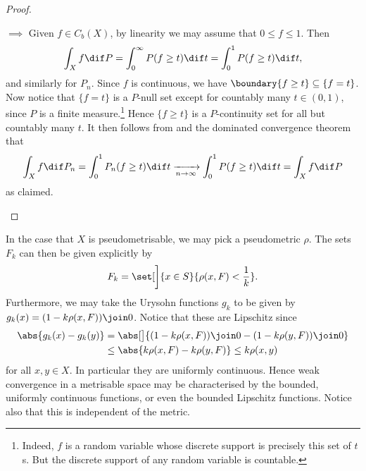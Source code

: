 \documentclass[article, a4paper, 11pt, oneside]{memoir}
\numberwithin{equation}{chapter}
\begin{document}
\begin{proof}
\begin{proofsec}
    \item[\subcref{enum:portmanteau-continuity-sets} $\implies$ \subcref{enum:portmanteau-weak-convergence}]
    Given $f \in C_b(X)$, by linearity we may assume that $0 \leq f \leq 1$. Then
    \begin{equation*}
        \int_X f \dif P
            = \int_0^\infty P( f \geq t ) \dif t
            = \int_0^1 P( f \geq t ) \dif t,
    \end{equation*}
    and similarly for $P_n$. Since $f$ is continuous, we have $\boundary \{ f \geq t \} \subseteq \{ f = t \}$. Now notice that $\{ f = t \}$ is a $P$-null set except for countably many $t \in (0,1)$, since $P$ is a finite measure.\footnote{Indeed, $f$ is a random variable whose discrete support is precisely this set of $t$s. But the discrete support of any random variable is countable.} Hence $\{ f \geq t \}$ is a $P$-continuity set for all but countably many $t$. It then follows from  and the dominated convergence theorem that
    \begin{equation*}
        \int_X f \dif P_n
            = \int_0^1 P_n( f \geq t ) \dif t
            \xrightarrow[n\to\infty]{} \int_0^1 P( f \geq t ) \dif t
            = \int_X f \dif P
    \end{equation*}
    as claimed.
\end{proofsec}
\end{proof}


\begin{remark}
    In the case that $X$ is pseudometrisable, we may pick a pseudometric $\rho$. The sets $F_k$ can then be given explicitly by
    \begin{equation*}
        F_k
            = \set[\bigg]{x \in S}{\rho(x,F) < \frac{1}{k}}.
    \end{equation*}
    Furthermore, we may take the Urysohn functions $g_k$ to be given by $g_k(x) = (1 - k\rho(x,F)) \join 0$. Notice that these are Lipschitz since
    \begin{align*}
        \abs{ g_k(x) - g_k(y) }
            &= \abs[\big]{ (1 - k\rho(x,F)) \join 0 - (1 - k\rho(y,F)) \join 0 } \\
            &\leq \abs{ k\rho(x,F) - k\rho(y,F) }
             \leq k \rho(x,y)
    \end{align*}
    for all $x,y \in X$. In particular they are uniformly continuous. Hence weak convergence in a metrisable space may be characterised by the bounded, uniformly continuous functions, or even the bounded Lipschitz functions. Notice also that this is independent of the metric.
\end{remark}
\end{document}
